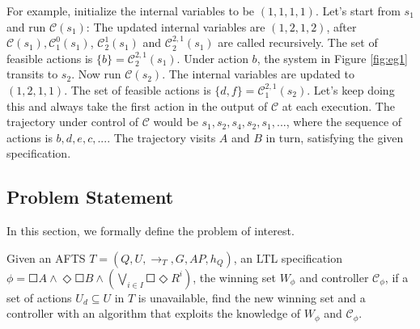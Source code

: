 \begin{example}
	For example, initialize the internal variables to be $ (1,1,1,1) $. Let's start from $ s_1 $ and run $ \mathcal{C}(s_1) $: The updated internal variables are $ (1,2,1,2) $, after $ \mathcal{C}(s_1), \mathcal{C}^0_1(s_1)$, $ \mathcal{C}^1_2(s_1) $ and $ \mathcal{C}^{2,1}_2(s_1) $ are called recursively. The set of feasible actions is $ \{b\}= \mathcal{C}^{2,1}_2(s_1) $. Under action $ b $, the system in Figure \ref{fig:eg1} transits to $ s_2 $. Now run $ \mathcal{C}(s_2) $. The internal variables are updated to $ (1,2,1,1) $. The set of feasible actions is $ \{d,f\}=\mathcal{C}^{2,1}_1(s_2) $. Let's keep doing this and always take the first action in the output of $ \mathcal{C} $ at each execution. The trajectory under control of $\mathcal{C} $ would be $ s_1,s_2,s_4,s_2,s_1,...$, where the sequence of actions is $ b,d,e,c,... $. The trajectory visits $ A $ and $ B $ in turn, satisfying the given specification.
	
\end{example}


\subsection{Problem Statement}
\label{sec:prob}
In this section, we formally define the problem of interest. %


\begin{problem}
	Given an AFTS $ T = (Q,U,\rightarrow_T,G,AP,h_Q) $, an LTL specification $ \phi = \Square A \wedge \Diamond \Square B \wedge \left( \bigvee_{i\in I} \Square \Diamond R^i\right) $, the winning set $ W_{\phi} $ and controller $ \mathcal{C}_{\phi} $, if a set of actions $ U_d\subseteq U $ in $ T $ is unavailable, find the new winning set and a controller with an algorithm that exploits the knowledge of $ W_{\phi} $ and $ \mathcal{C}_{\phi} $.\label{prob}
\end{problem}

